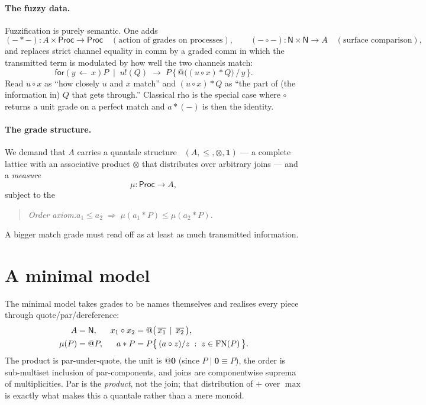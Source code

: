 \documentclass[11pt]{article}
\makeatletter
\theoremstyle{plain}
\theoremstyle{definition}
\theoremstyle{remark}
\newcommand{\nil}{\mathbf{0}}
\newcommand{\for}[2]{\mathsf{for}(#1 \,{\leftarrow}\, #2)}
\newcommand{\out}[2]{#1\mathord{!}(#2)}
\newcommand{\quo}[1]{@#1}
\newcommand{\dr}[1]{\,\overline{#1}\,}   %
\newcommand{\act}{\mathbin{*}}
\newcommand{\cmp}{\mathbin{\circ}}       %
\newcommand{\meas}{\mu}
\newcommand{\redto}{\longrightarrow}
\newcommand{\Proc}{\mathsf{Proc}}
\newcommand{\Names}{\mathsf{N}}
\newcommand{\FN}{\mathrm{FN}}
\newcommand{\unit}{\mathbf{1}}
\makeatother
\begin{document}
\paragraph{The fuzzy data.} Fuzzification is purely semantic. One adds
\[
(-\act-)\colon A\times\Proc\to\Proc \quad(\text{action of grades on processes}),\qquad
(-\cmp-)\colon \Names\times\Names\to A \quad(\text{surface comparison}),
\]
and replaces strict channel equality in comm by a graded comm in which the transmitted term is
modulated by how well the two channels match:
\begin{equation}\label{eq:fcomm}
\for{y}{x}P \;\mid\; \out{u}{Q} \;\redto\; P\,\bigl\{\,\quo{\big((u\cmp x)\act Q\big)}\,\big/\,y\,\bigr\}.
\end{equation}
Read $u\cmp x$ as ``how closely $u$ and $x$ match'' and $(u\cmp x)\act Q$ as ``the part of (the
information in) $Q$ that gets through.'' Classical rho is the special case where $\cmp$ returns a
unit grade on a perfect match and $a\act(-)$ is then the identity.

\paragraph{The grade structure.} We demand that $A$ carries a quantale structure~\cite{mulvey,rosenthal}
$(A,\le,\otimes,\unit)$ --- a complete lattice with an associative product $\otimes$ that distributes
over arbitrary joins --- and a \emph{measure}
\[
\meas\colon \Proc \to A,
\]
subject to the
\begin{quote}\itshape
Order axiom.\quad $a_1\le a_2 \;\Longrightarrow\; \meas(a_1\act P)\le \meas(a_2\act P)$.
\end{quote}
A bigger match grade must read off as at least as much transmitted information.

\section{A minimal model}\label{sec:model}

The minimal model takes grades to be names themselves and realises every piece through
quote/par/dereference:
\begin{align}
A &= \Names, & x_1\cmp x_2 &= \quo{\big(\dr{x_1}\mid \dr{x_2}\big)},\notag\\
\meas(P) &= \quo P, & a\act P &= P\bigl\{\,(a\cmp z)/z \;:\; z\in\FN(P)\,\bigr\}.\label{eq:modeldefs}
\end{align}
The product is par-under-quote, the unit is $\quo{\nil}$ (since $P\mid\nil\equiv P$), the order is
sub-multiset inclusion of par-components, and joins are componentwise suprema of multiplicities.
Par is the \emph{product}, not the join; that distribution of $+$ over $\max$ is exactly what makes
this a quantale rather than a mere monoid.
\end{document}
